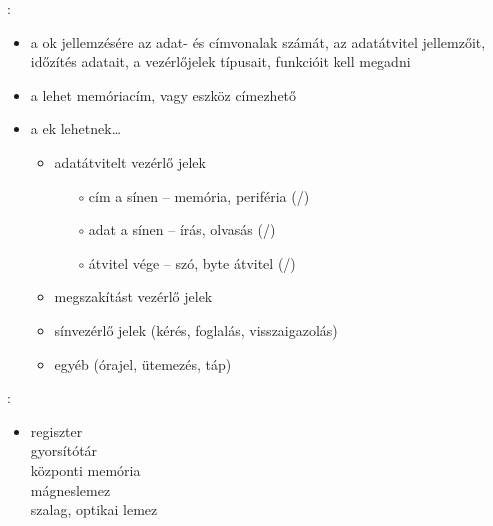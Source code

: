 \documentclass[main.tex]{subfiles}
\begin{document}
  {\large {}:}
  \begin{itemize}
    \item a ok jellemzésére
    az adat- és címvonalak számát,
    az adatátvitel jellemzőit, időzítés adatait,
    a vezérlőjelek típusait, funkcióit kell megadni

    \item a  lehet memóriacím, vagy
     eszköz címezhető

    \item a ek lehetnek\dots
    \begin{itemize}
      \item adatátvitelt vezérlő jelek
      \begin{itemize}
        \item[$\circ$] cím a sínen
        \tabto{2.7cm} – \tabto{3.3cm}
        memória, periféria (/)

        \item[$\circ$] adat a sínen
        \tabto{2.7cm} – \tabto{3.3cm}
        írás, olvasás (/)

        \item[$\circ$] átvitel vége
        \tabto{2.7cm} – \tabto{3.3cm}
        szó, byte átvitel (/)
      \end{itemize}

      \item megszakítást vezérlő jelek
      \item sínvezérlő jelek (kérés, foglalás, visszaigazolás)
      \item egyéb (órajel, ütemezés, táp)
    \end{itemize}
  \end{itemize}

  
  {\large {}:}
  \begin{itemize}
    \item
    regiszter \\
    gyorsítótár \\
    központi memória \\
    mágneslemez \\
    szalag, optikai lemez
  \end{itemize}
\end{document}
